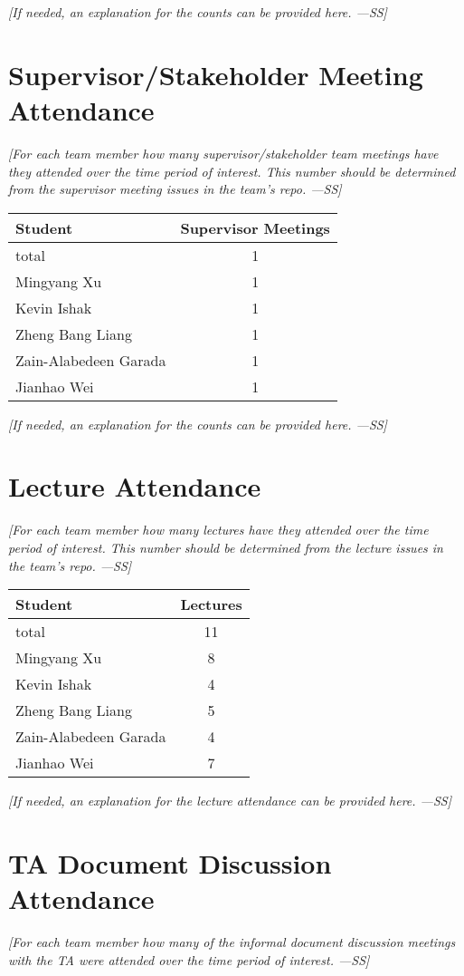 \documentclass[12pt]{article}
\begin{document}
\textit{[If needed, an explanation for the counts can be provided here. ---SS]}

\section{Supervisor/Stakeholder Meeting Attendance}
\textit{[For each team member how many supervisor/stakeholder team meetings have they attended over the time period of interest. This number should be determined from the supervisor meeting issues in the team’s repo. ---SS]}

\begin{longtable}{|l|c|}
\hline
\textbf{Student} & \textbf{Supervisor Meetings} \\
\hline
total & 1 \\
Mingyang Xu & 1 \\
Kevin Ishak & 1 \\
Zheng Bang Liang & 1 \\
Zain-Alabedeen Garada & 1 \\
Jianhao Wei & 1 \\
\hline
\end{longtable}

\textit{[If needed, an explanation for the counts can be provided here. ---SS]}

\section{Lecture Attendance}
\textit{[For each team member how many lectures have they attended over the time period of interest. This number should be determined from the lecture issues in the team’s repo. ---SS]}

\begin{longtable}{|l|c|}
\hline
\textbf{Student} & \textbf{Lectures} \\
\hline
total & 11 \\
Mingyang Xu & 8 \\
Kevin Ishak & 4 \\
Zheng Bang Liang & 5 \\
Zain-Alabedeen Garada & 4 \\
Jianhao Wei & 7 \\
\hline
\end{longtable}

\textit{[If needed, an explanation for the lecture attendance can be provided here. ---SS]}

\section{TA Document Discussion Attendance}
\textit{[For each team member how many of the informal document discussion meetings with the TA were attended over the time period of interest. ---SS]}
\end{document}

